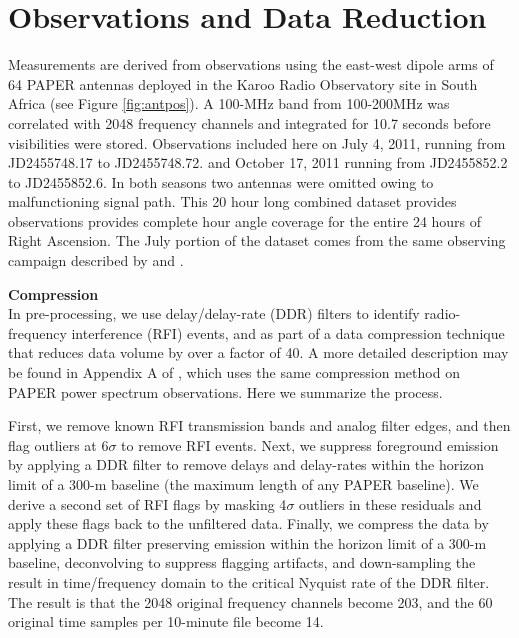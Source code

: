 \documentclass[preprint]{aastex}
\begin{document}
 
 \section{Observations and Data Reduction}
 \label{sec:Observations}
 Measurements are derived from observations using  the east-west dipole arms of 64 PAPER antennas 
deployed in the Karoo Radio Observatory site in South Africa (see Figure \ref{fig:antpos}).  
A 100-MHz band from 100-200MHz was
correlated with 2048 frequency channels and integrated for 10.7 seconds before visibilities were stored.
Observations included here on  July 4, 2011, running
from JD2455748.17 to JD2455748.72. and October 17, 2011 running from JD2455852.2 to JD2455852.6.
In both seasons two antennas were omitted owing to malfunctioning signal path. This 20 hour long combined dataset provides observations provides complete hour angle coverage for the entire 24 hours of Right Ascension. The July portion of the dataset comes from the same observing campaign described by \cite{Pober:2013p9567} and \cite{Stefan:2012p9707}. 

\textbf{Compression}\\
In pre-processing, we use delay/delay-rate (DDR) filters \citep{Parsons:2009p7859} to identify
radio-frequency interference (RFI) events, and as part of a data compression
technique that reduces data volume by over a factor of 40.  A more detailed description may be found in Appendix A of \cite{Parsons2013b}, which uses the same compression method on PAPER power spectrum observations. Here we summarize the process.

First, we remove known RFI transmission bands and analog filter edges, and then 
 flag outliers at 6$\sigma$ to remove RFI events.
Next, we suppress foreground emission by applying a DDR filter to remove delays and delay-rates 
within the horizon limit of a 300-m baseline (the maximum length of any PAPER baseline).
We derive a second set of RFI flags by masking 4$\sigma$ outliers in these residuals and apply these flags back
to the unfiltered data.  Finally, we compress the data by applying a 
DDR filter preserving emission within the horizon limit of a 300-m baseline, deconvolving to suppress 
flagging artifacts, and down-sampling the result in time/frequency domain to the critical Nyquist rate of
the DDR filter.
The result is that the 2048 original frequency channels become 203, and the
60 original time samples per 10-minute file become 14. 
\end{document}
